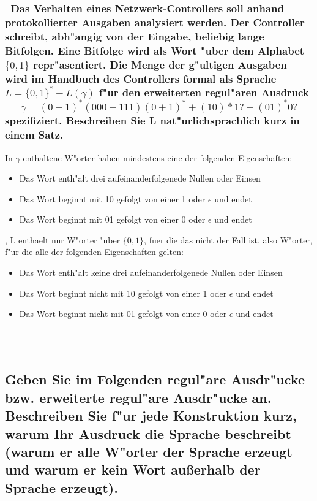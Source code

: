 \documentclass{article}
\newcommand{\gap}{\null\ \\ \\}
\newcommand{\eps}{\epsilon}
\begin{document}
\subsubsection{\
    Das Verhalten eines Netzwerk-Controllers soll anhand protokollierter 
        Ausgaben analysiert werden. Der Controller schreibt, abh"angig von der 
        Eingabe, beliebig lange Bitfolgen. Eine Bitfolge wird als Wort "uber dem 
        Alphabet $\{0, 1\}$ repr"asentiert. Die Menge der g"ultigen Ausgaben wird
        im  Handbuch des Controllers formal als Sprache 
        $L = \{0,1\}^* - L(\gamma)$ f"ur den erweiterten regul"aren Ausdruck\[
            \gamma = (0+1)^* (000 + 111)(0+1)^* + (10)*1? + (01)^*0?
            \]
        spezifiziert. Beschreiben Sie L nat"urlichsprachlich kurz in einem Satz.
    }
In $\gamma$ enthaltene W"orter haben mindestens eine der folgenden
Eigenschaften:\\
\begin{itemize}
    \item Das Wort enth"alt drei aufeinanderfolgenede Nullen oder Einsen
    \item Das Wort beginnt mit 10 gefolgt von einer 1 oder $\eps$ und endet
    \item Das Wort beginnt mit 01 gefolgt von einer 0 oder $\eps$ und endet
\end{itemize}
, L enthaelt nur W"orter "uber $\{0, 1\}$, fuer die das nicht der Fall ist,
    also W"orter, f"ur die alle der folgenden Eigenschaften gelten:\\
\begin{itemize}
    \item Das Wort enth"alt keine drei aufeinanderfolgenede Nullen oder Einsen
    \item Das Wort beginnt nicht mit 10 gefolgt von einer 1 oder $\eps$ und 
            endet
    \item Das Wort beginnt nicht mit 01 gefolgt von einer 0 oder $\eps$ und 
            endet
\end{itemize}

\gap
\subsection{
    Geben Sie im Folgenden regul"are Ausdr"ucke bzw. erweiterte regul"are 
        Ausdr"ucke an. Beschreiben Sie f"ur jede Konstruktion kurz, warum Ihr 
        Ausdruck die Sprache beschreibt (warum er alle W"orter der Sprache 
        erzeugt und warum er kein Wort außerhalb der Sprache erzeugt).
    }
\end{document}

